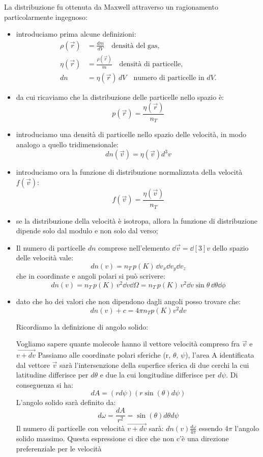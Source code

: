 \documentclass{article}
\begin{document}
La distribuzione fu ottenuta da Maxwell attraverso un ragionamento particolarmente ingegnoso:
\begin{itemize}
    \item introduciamo prima alcune definizioni:
    \begin{align*}
        \rho(\vec{r}) &= \frac{dm}{dV} \quad \text{densità del gas}, \\[6pt]
        \eta(\vec{r}) &= \frac{\rho(\vec{r})}{m} \quad \text{densità di particelle}, \\[6pt]
        dn &= \eta(\vec{r}) \, dV \quad \text{numero di particelle in } dV.
    \end{align*}
    \item da cui ricaviamo che la distribuzione delle particelle nello spazio è:
    \[ p(\vec{r})=\frac{\eta (\vec{r})}{n_T}\]
    \item introduciamo una densità di particelle nello spazio delle velocità, in modo analogo a quello tridimensionale: \[ dn(\vec{v})=\eta (\vec{v})d^3v\]
    \item introduciamo ora la funzione di distribuzione normalizzata della velocità $f(\vec{v})$: \[ f(\vec{v})=\frac{\eta (\vec{v})}{n_T}\]
    \item se la distribuzione della velocità è isotropa, allora la funzione di distribuzione dipende solo dal modulo e non solo dal verso;
    \item Il numero di particelle \( dn \) comprese nell'elemento \( \dd{\vec{v}} = \dd[3]{v} \) dello spazio delle velocità vale:
   \[
        dn(v) = n_T \, p(K) \, \dd{v_x} \dd{v_y} \dd{v_z}
    \]
    che in coordinate e angoli polari si può scrivere:
    \[
        dn(v) = n_T \, p(K) \, v^2 \dd{v} \dd{\Omega} = n_T \, p(K) \, v^2 \dd{v} \sin\theta \, \dd{\theta} \dd{\phi}
    \]
    \item dato che ho dei valori che non dipendono dagli angoli posso trovare che:
    \[
    dn(v)+c=4 \pi n_T p(K) v^2 dv 
    \]
\begin{nota}
    Ricordiamo la definizione di angolo solido:

    Vogliamo sapere quante molecole hanno il vettore velocità compreso fra $\vec{v}$ e $\vec{v+dv}$ Passiamo alle coordinate polari sferiche (r, $\theta$, $\psi$), l'area A identificata dal vettore $\vec{v}$
    sarà l'intersenzione della superfice sferica di due cerchi la cui latitudine differisce per $d\theta$ e due la cui longitudine differisce per $d\psi$. Di conseguenza si ha:
    \[
    dA=(rd\psi)(r\sin(\theta)d\psi)
    \]
    L'angolo solido sarà definito da:
    \[
    d\omega=\frac{dA}{r^2}=\sin(\theta)d\theta d\psi
    \]
    Il numero di particelle con velocità $\vec{v+dv}$ sarà: $dn(v)\frac{d\omega}{4\pi}$ essendo $4\pi$ l'angolo solido massimo. Questa espressione ci dice
    che non c'è una direzione preferenziale per le velocità


\end{nota}
\end{itemize}
\end{document}
